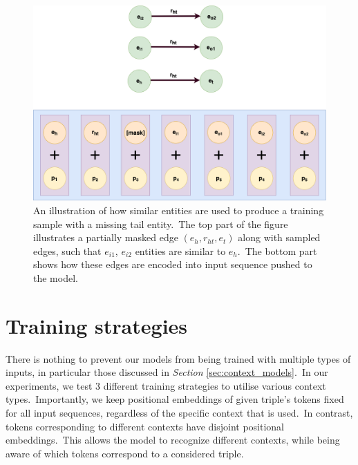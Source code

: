 \documentclass[longabstract, english, mgr]{iithesis}
\theoremstyle{default_theorem_style}\newtheorem{theorem}{Theorem}
\theoremstyle{default_theorem_style}\newtheorem{definition}{Definition}
\begin{document}
\begin{figure}[h!]
\centering
\includegraphics[scale=0.27]{similarity_based_model_output_variant}
\caption{An illustration of how similar entities are used to produce a training sample with a missing tail
entity.\ The top part of the figure illustrates a partially masked edge $(e_h, r_{ht}, e_t)$ along with sampled edges,
such that $e_{i1}$, $e_{i2}$ entities are similar to $e_h$.\ The bottom part shows how these edges are encoded into
input sequence pushed to the model.}
\label{fig:similarity_based_model_output_variant}
\end{figure}

\section{Training strategies}\label{sec:training_strategies}

There is nothing to prevent our models from being trained with multiple types of inputs, in particular those
discussed in \textit{Section} \ref{sec:context_models}.\ In our experiments, we test 3 different training strategies
to utilise various context types.\ Importantly, we keep positional embeddings of given triple's tokens fixed for all
input sequences, regardless of the specific context that is used.\ In contrast, tokens corresponding to different
contexts have disjoint positional embeddings.\ This allows the model to recognize different contexts, while
being aware of which tokens correspond to a considered triple.\newline
\end{document}
